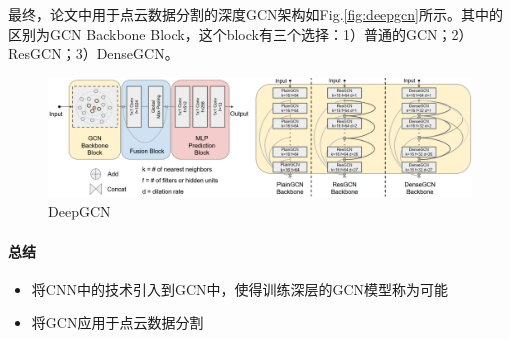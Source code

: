最终，论文中用于点云数据分割的深度GCN架构如Fig.\ref{fig:deepgcn}所示。其中的区别为GCN Backbone Block，这个block有三个选择：1）普通的GCN；2）ResGCN；3）DenseGCN。
\begin{figure}[h]
	\centering
	\includegraphics[width=.85\textwidth]{pics/DeepGCN.png}
	\caption{DeepGCN}
	\label{figz:deepgcn}
\end{figure}

\paragraph{总结}

\begin{itemize}

	\item 将CNN中的技术引入到GCN中，使得训练深层的GCN模型称为可能
	\item 将GCN应用于点云数据分割

\end{itemize}









